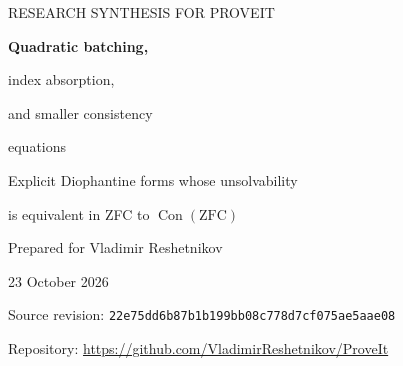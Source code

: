 \documentclass[11pt,a4paper]{article}
\newcommand{\Con}{\operatorname{Con}}
\newcommand{\repoPin}{\texttt{22e75dd6b87b1b199bb08c778d7cf075ae5aae08}}
\theoremstyle{definition}
\theoremstyle{remark}
\numberwithin{equation}{section}
\begin{document}
\hypersetup{pageanchor=false}
\begin{titlepage}
\vspace*{18mm}
{\small\sffamily\color{blue!45!black} RESEARCH SYNTHESIS FOR PROVEIT}\par
\vspace{8mm}
{\Huge\bfseries Quadratic batching,\par index absorption,\par and smaller consistency\par equations}\par
\vspace{8mm}
{\Large Explicit Diophantine forms whose unsolvability\par is equivalent in ZFC to $\Con(\mathrm{ZFC})$}\par
\vspace{8mm}
{\large Prepared for Vladimir Reshetnikov\par 23 October 2026}
\vspace{12mm}
\begin{abstract}
We give three compatible improvements over the Diophantine consistency
forms at the pinned ProveIt repository revision. First, we test its
22 quadratic residuals simultaneously, using a 32-element Sidon set,
instead of first forming a quartic sum of squares and then using
exponential positional weights. The Jones interface yields a polynomial
in nine nonnegative integers of exact degree $166\,177\,600$ and an
868-operation evaluator; the strictly positive version uses 864
operations. A companion through the existing Sun interface has ten
unrestricted integer unknowns, exact degree $449\,607\,016$, and 773
operations. Second, a short-range Pell-index argument absorbs an index
quotient into the existing norm carrier, giving eleven positive unknowns
at degree 1154, or a two-equation system of degrees 2 and 1152; a
further positive translation gives degree 1140. Third,
complementing whole tile labels replaces bitwise clauses and reduces the
fixed native coefficient payload by about $33\%$.

All constants have finite recipes. The native tuple and source size
constants also have materialized binary payloads.
The archive contains explicit division-free circuits, a complete proof
of the new reductions, dependency records, and independent finite
certificates. The mathematical equivalences use the inherited native
compiler and literal K215 calibration. The ten-integer companion also
uses Sun's 2026 preprint. This report does not claim an end-to-end new
proof-assistant theorem, global minimality, or a proof of consistency.
\end{abstract}
\vfill
{\small Source revision: \repoPin\par
Repository: \url{https://github.com/VladimirReshetnikov/ProveIt}}
\end{titlepage}
\end{document}
